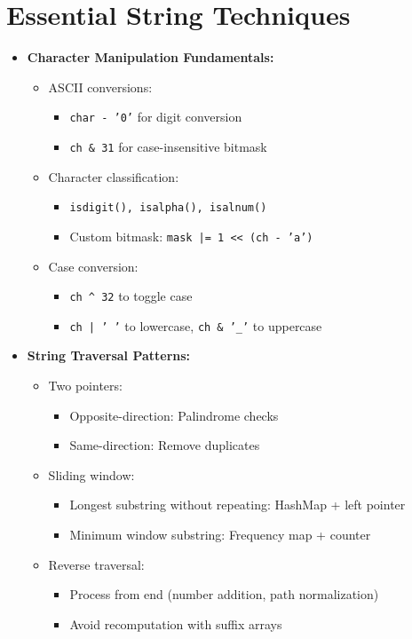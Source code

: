 \documentclass[a4paper,10pt]{book}
\begin{document}
\chapter{Essential String Techniques }
\label{sec:string}
\begin{itemize}
    \item \textbf{Character Manipulation Fundamentals:}
    \begin{itemize}
        \item ASCII conversions:
        \begin{itemize}
            \item \texttt{char - '0'} for digit conversion
            \item \texttt{ch \& 31} for case-insensitive bitmask
        \end{itemize}
        \item Character classification:
        \begin{itemize}
            \item \texttt{isdigit(), isalpha(), isalnum()}
            \item Custom bitmask: \texttt{mask |= 1 << (ch - 'a')}
        \end{itemize}
        \item Case conversion:
        \begin{itemize}
            \item \texttt{ch \^{} 32} to toggle case
            \item \texttt{ch | ' '} to lowercase, \texttt{ch \& '\_'} to uppercase
        \end{itemize}
    \end{itemize}
    
    \item \textbf{String Traversal Patterns:}
    \begin{itemize}
        \item Two pointers:
        \begin{itemize}
            \item Opposite-direction: Palindrome checks
            \item Same-direction: Remove duplicates
        \end{itemize}
        \item Sliding window:
        \begin{itemize}
            \item Longest substring without repeating: HashMap + left pointer
            \item Minimum window substring: Frequency map + counter
        \end{itemize}
        \item Reverse traversal:
        \begin{itemize}
            \item Process from end (number addition, path normalization)
            \item Avoid recomputation with suffix arrays
        \end{itemize}
    \end{itemize}
    

\end{itemize}
\end{document}
